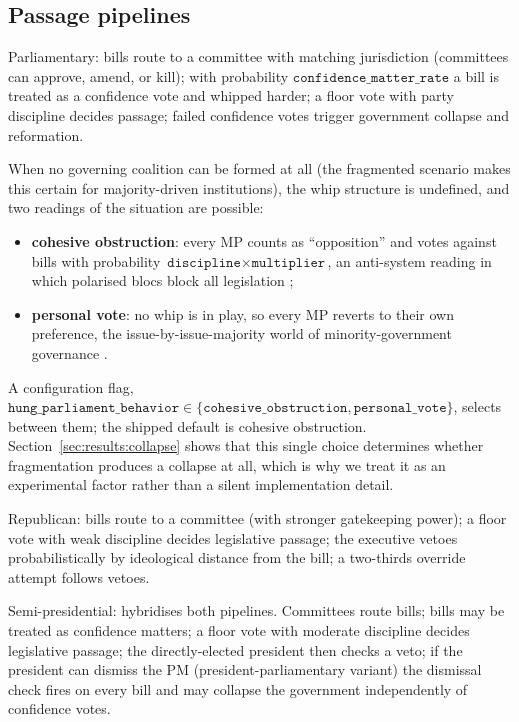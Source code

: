 \documentclass[11pt]{article}
\begin{document}
\subsection{Passage pipelines}
Parliamentary: bills route to a committee with matching jurisdiction
(committees can approve, amend, or kill); with probability
$\texttt{confidence\_matter\_rate}$ a bill is treated as a confidence vote
and whipped harder; a floor vote with party discipline decides passage;
failed confidence votes trigger government collapse and reformation.

When no governing coalition can be formed at all (the fragmented scenario
makes this certain for majority-driven institutions), the whip structure is
undefined, and two readings of the situation are possible:
\begin{itemize}
    \item \textbf{cohesive obstruction}: every MP counts as ``opposition''
        and votes against bills with probability
        $\texttt{discipline} \times \texttt{multiplier}$, an anti-system
        reading in which polarised blocs block all legislation
        \citep{sartori1976, capoccia2005};
    \item \textbf{personal vote}: no whip is in play, so every MP reverts to
        their own preference, the issue-by-issue-majority world of
        minority-government governance \citep{strom1984, strom1990,
        laver1990}.
\end{itemize}
A configuration flag, $\texttt{hung\_parliament\_behavior} \in
\{\texttt{cohesive\_obstruction}, \texttt{personal\_vote}\}$, selects between
them; the shipped default is cohesive obstruction. Section~\ref{sec:results:collapse}
shows that this single choice determines whether fragmentation produces a
collapse at all, which is why we treat it as an experimental factor rather
than a silent implementation detail.

Republican: bills route to a committee (with stronger gatekeeping power);
a floor vote with weak discipline decides legislative passage; the
executive vetoes probabilistically by ideological distance from the bill;
a two-thirds override attempt follows vetoes.

Semi-presidential: hybridises both pipelines. Committees route bills;
bills may be treated as confidence matters; a floor vote with moderate
discipline decides legislative passage; the directly-elected president
then checks a veto; if the president can dismiss the PM
(president-parliamentary variant) the dismissal check fires on every bill
and may collapse the government independently of confidence votes.
\end{document}
